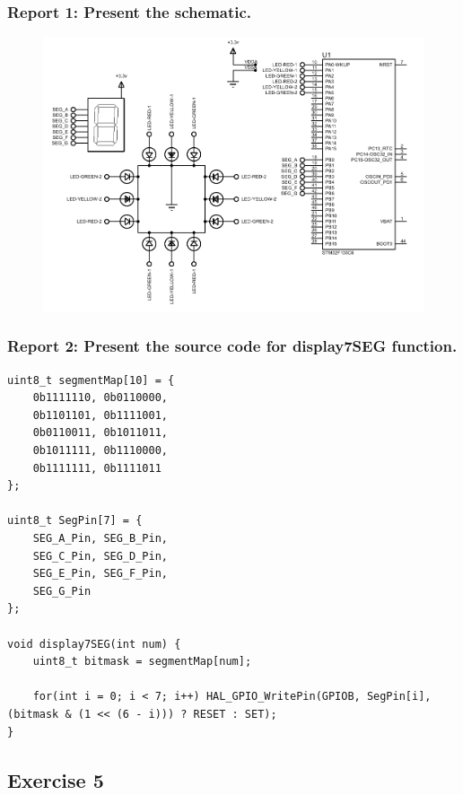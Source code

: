 \documentclass[a4paper,12pt]{article}
\begin{document}
\subsubsection{Report 1: Present the schematic.}
\label{ex4r1}
\begin{figure}[H]
	\centering
	\includegraphics[width=0.95\linewidth]{Attachments/1.4.1.PDF}
\end{figure}
\subsubsection{Report 2: Present the source code for display7SEG function.}
\begin{lstlisting}
uint8_t segmentMap[10] = {
	0b1111110, 0b0110000,
	0b1101101, 0b1111001,
	0b0110011, 0b1011011,
	0b1011111, 0b1110000,
	0b1111111, 0b1111011
};

uint8_t SegPin[7] = {
	SEG_A_Pin, SEG_B_Pin,
	SEG_C_Pin, SEG_D_Pin,
	SEG_E_Pin, SEG_F_Pin,
	SEG_G_Pin
};

void display7SEG(int num) {
	uint8_t bitmask = segmentMap[num];
	
	for(int i = 0; i < 7; i++) HAL_GPIO_WritePin(GPIOB, SegPin[i], (bitmask & (1 << (6 - i))) ? RESET : SET);
}
\end{lstlisting}
\newpage
\subsection{Exercise 5}
\end{document}
